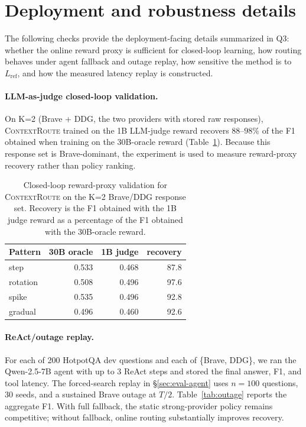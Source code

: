 \documentclass[11pt]{article}
\newcommand{\contextroute}{\textsc{ContextRoute}}
\begin{document}
\section{Deployment and robustness details}
\label{app:deploydetails}

The following checks provide the deployment-facing details summarized in Q3: whether the online reward proxy is sufficient for closed-loop learning, how routing behaves under agent fallback and outage replay, how sensitive the method is to $L_{\text{ref}}$, and how the measured latency replay is constructed.

\paragraph{LLM-as-judge closed-loop validation.}
\label{app:closedloop-rc}

On K=2 (Brave + DDG, the two providers with stored raw responses), \contextroute{} trained on the 1B LLM-judge reward recovers $88$--$98\%$ of the F1 obtained when training on the 30B-oracle reward (Table~\ref{tab:closedloop}). Because this response set is Brave-dominant, the experiment is used to measure reward-proxy recovery rather than policy ranking.

\begin{table}[ht]
\centering\scriptsize
\setlength{\tabcolsep}{5pt}
\begin{tabular}{lrrr}
\toprule
Pattern & 30B oracle & 1B judge & recovery \\
\midrule
step & 0.533 & 0.468 & 87.8 \\
rotation & 0.508 & 0.496 & 97.6 \\
spike & 0.535 & 0.496 & 92.8 \\
gradual & 0.496 & 0.460 & 92.6 \\
\bottomrule
\end{tabular}
\caption{Closed-loop reward-proxy validation for \contextroute{} on the K=2
Brave/DDG response set. Recovery is the F1 obtained with the 1B judge reward as
a percentage of the F1 obtained with the 30B-oracle reward.}
\label{tab:closedloop}
\end{table}

\paragraph{ReAct/outage replay.}
\label{app:reactdetails}

For each of 200 HotpotQA dev questions and each of \{Brave, DDG\}, we ran the Qwen-2.5-7B agent with up to 3 ReAct steps and stored the final answer, F1, and tool latency. The forced-search replay in \S\ref{sec:eval-agent} uses $n=100$ questions, 30 seeds, and a sustained Brave outage at $T/2$. Table~\ref{tab:outage} reports the aggregate F1. With full fallback, the static strong-provider policy remains competitive; without fallback, online routing substantially improves recovery.
\end{document}
